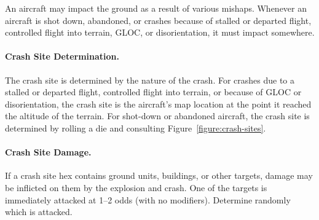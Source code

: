 \begin{advancedrules}
{}{
An aircraft may impact the ground as a result of various mishaps. Whenever an aircraft is shot down, abandoned, or crashes because of stalled or departed flight, controlled flight into terrain, GLOC, or disorientation, it must impact somewhere.

\paragraph{Crash Site Determination.} The crash site is determined by the nature of the crash. For crashes due to a stalled or departed flight, controlled flight into terrain, or because of GLOC or disorientation, the crash site is the aircraft's  map location at the point it reached the altitude of the terrain. For shot-down or abandoned aircraft, the crash site is determined by rolling a die and consulting Figure~\ref{figure:crash-sites}.

\paragraph{Crash Site Damage.} If a crash site hex contains ground units, buildings, or other targets, damage may be inflicted on them by the explosion and crash. One of the targets is immediately attacked at 1--2 odds (with no modifiers). Determine randomly which is attacked.
}

\end{advancedrules}
